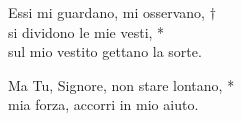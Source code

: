 \spazio


\spazio

\strofa Essi mi guardano, mi osservano, $\dagger$\\
si dividono le mie vesti, *\\
sul mio vestito gettano la sorte.

\spazio


\spazio

\strofa Ma Tu, Signore, non stare lontano, *\\
mia forza, accorri in mio aiuto.

\spazio

